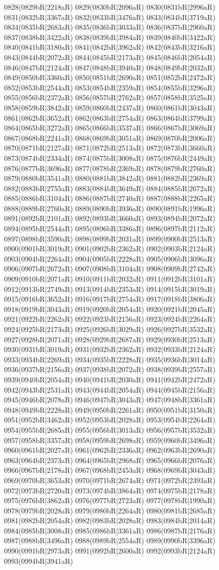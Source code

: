 0828(0829bR|2218aR) 0829(0830bR|2096aR) 0830(0831bR|2996aR) 0831(0832bR|3367aR) 0832(0833bR|3476aR) 0833(0834bR|3719aR) 0834(0835bR|2683aR) 0835(0836bR|3033aR) 0836(0837bR|2960aR) 0837(0838bR|3422aR) 0838(0839bR|3984aR) 0839(0840bR|3422aR) 0840(0841bR|3180aR) 0841(0842bR|3962aR) 0842(0843bR|3216aR) 0843(0844bR|2072aR) 0844(0845bR|2173aR) 0845(0846bR|2054aR) 0846(0847bR|2124aR) 0847(0848bR|3940aR) 0848(0849bR|2032aR) 0849(0850bR|3360aR) 0850(0851bR|2690aR) 0851(0852bR|2472aR) 0852(0853bR|2544aR) 0853(0854bR|2359aR) 0854(0855bR|3296aR) 0855(0856bR|2372aR) 0856(0857bR|2762aR) 0857(0858bR|3525aR) 0858(0859bR|3842aR) 0859(0860bR|2437aR) 0860(0861bR|3043aR) 0861(0862bR|3652aR) 0862(0863bR|2754aR) 0863(0864bR|3799aR) 0864(0865bR|3272aR) 0865(0866bR|3537aR) 0866(0867bR|3069aR) 0867(0868bR|2241aR) 0868(0869bR|3051aR) 0869(0870bR|2006aR) 0870(0871bR|2127aR) 0871(0872bR|2513aR) 0872(0873bR|3660aR) 0873(0874bR|2334aR) 0874(0875bR|3008aR) 0875(0876bR|2449aR) 0876(0877bR|3696aR) 0877(0878bR|2369aR) 0878(0879bR|2760aR) 0879(0880bR|3541aR) 0880(0881bR|3842aR) 0881(0882bR|2369aR) 0882(0883bR|2755aR) 0883(0884bR|3649aR) 0884(0885bR|2672aR) 0885(0886bR|3104aR) 0886(0887bR|2740aR) 0887(0888bR|2265aR) 0888(0889bR|2760aR) 0889(0890bR|3936aR) 0890(0891bR|1996aR) 0891(0892bR|2101aR) 0892(0893bR|3660aR) 0893(0894bR|2072aR) 0894(0895bR|2544aR) 0895(0896bR|3386aR) 0896(0897bR|2112aR) 0897(0898bR|3590aR) 0898(0899bR|2031aR) 0899(0900bR|2513aR) 0900(0901bR|3019aR) 0901(0902bR|2362aR) 0902(0903bR|2124aR) 0903(0904bR|2264aR) 0904(0905bR|2228aR) 0905(0906bR|3096aR) 0906(0907bR|2672aR) 0907(0908bR|3104aR) 0908(0909bR|2742aR) 0909(0910bR|2071aR) 0910(0911bR|2032aR) 0911(0912bR|3101aR) 0912(0913bR|2749aR) 0913(0914bR|2353aR) 0914(0915bR|3019aR) 0915(0916bR|3652aR) 0916(0917bR|2754aR) 0917(0918bR|3806aR) 0918(0919bR|3043aR) 0919(0920bR|2054aR) 0920(0921bR|2045aR) 0921(0922bR|2262aR) 0922(0923bR|2156aR) 0923(0924bR|2264aR) 0924(0925bR|2173aR) 0925(0926bR|3029aR) 0926(0927bR|3532aR) 0927(0928bR|2071aR) 0928(0929bR|2687aR) 0929(0930bR|2513aR) 0930(0931bR|3019aR) 0931(0932bR|2362aR) 0932(0933bR|2124aR) 0933(0934bR|2269aR) 0934(0935bR|2228aR) 0935(0936bR|3014aR) 0936(0937bR|2156aR) 0937(0938bR|2072aR) 0938(0939bR|2557aR) 0939(0940bR|2054aR) 0940(0941bR|2030aR) 0941(0942bR|2472aR) 0942(0943bR|2531aR) 0943(0944bR|2054aR) 0944(0945bR|2156aR) 0945(0946bR|2078aR) 0946(0947bR|3043aR) 0947(0948bR|3361aR) 0948(0949bR|2228aR) 0949(0950bR|2261aR) 0950(0951bR|3150aR) 0951(0952bR|3462aR) 0952(0953bR|2028aR) 0953(0954bR|2264aR) 0954(0955bR|2685aR) 0955(0956bR|3013aR) 0956(0957bR|3532aR) 0957(0958bR|3357aR) 0958(0959bR|2698aR) 0959(0960bR|3496aR) 0960(0961bR|2027aR) 0961(0962bR|2336aR) 0962(0963bR|2690aR) 0963(0964bR|2373aR) 0964(0965bR|2968aR) 0965(0966bR|2076aR) 0966(0967bR|2178aR) 0967(0968bR|2453aR) 0968(0969bR|3043aR) 0969(0970bR|3653aR) 0970(0971bR|2674aR) 0971(0972bR|2393aR) 0972(0973bR|2720aR) 0973(0974bR|3864aR) 0974(0975bR|2178aR) 0975(0976bR|3862aR) 0976(0977bR|2723aR) 0977(0978bR|1990aR) 0978(0979bR|2028aR) 0979(0980bR|2264aR) 0980(0981bR|2685aR) 0981(0982bR|2054aR) 0982(0983bR|2028aR) 0983(0984bR|2014aR) 0984(0985bR|3008aR) 0985(0986bR|3361aR) 0986(0987bR|2176aR) 0987(0988bR|3496aR) 0988(0989bR|2554aR) 0989(0990bR|3396aR) 0990(0991bR|2973aR) 0991(0992bR|2600aR) 0992(0993bR|2124aR) 0993(0994bR|3941aR) 